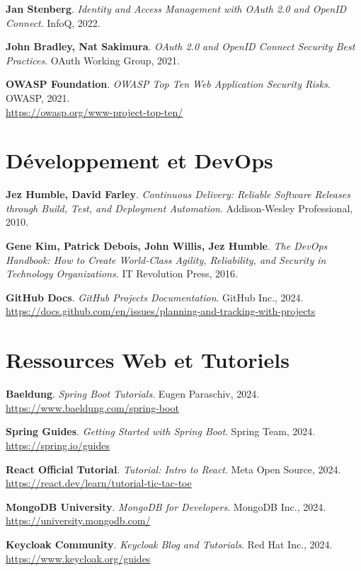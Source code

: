 \noindent [32] \textbf{Jan Stenberg}. \textit{Identity and Access Management with OAuth 2.0 and OpenID Connect}. InfoQ, 2022.

\noindent [33] \textbf{John Bradley, Nat Sakimura}. \textit{OAuth 2.0 and OpenID Connect Security Best Practices}. OAuth Working Group, 2021.

\noindent [34] \textbf{OWASP Foundation}. \textit{OWASP Top Ten Web Application Security Risks}. OWASP, 2021. \\
\url{https://owasp.org/www-project-top-ten/}

\section*{Développement et DevOps}

\noindent [35] \textbf{Jez Humble, David Farley}. \textit{Continuous Delivery: Reliable Software Releases through Build, Test, and Deployment Automation}. Addison-Wesley Professional, 2010.

\noindent [36] \textbf{Gene Kim, Patrick Debois, John Willis, Jez Humble}. \textit{The DevOps Handbook: How to Create World-Class Agility, Reliability, and Security in Technology Organizations}. IT Revolution Press, 2016.

\noindent [37] \textbf{GitHub Docs}. \textit{GitHub Projects Documentation}. GitHub Inc., 2024. \\
\url{https://docs.github.com/en/issues/planning-and-tracking-with-projects}

\section*{Ressources Web et Tutoriels}

\noindent [41] \textbf{Baeldung}. \textit{Spring Boot Tutorials}. Eugen Paraschiv, 2024. \\
\url{https://www.baeldung.com/spring-boot}

\noindent [42] \textbf{Spring Guides}. \textit{Getting Started with Spring Boot}. Spring Team, 2024. \\
\url{https://spring.io/guides}

\noindent [43] \textbf{React Official Tutorial}. \textit{Tutorial: Intro to React}. Meta Open Source, 2024. \\
\url{https://react.dev/learn/tutorial-tic-tac-toe}

\noindent [44] \textbf{MongoDB University}. \textit{MongoDB for Developers}. MongoDB Inc., 2024. \\
\url{https://university.mongodb.com/}

\noindent [45] \textbf{Keycloak Community}. \textit{Keycloak Blog and Tutorials}. Red Hat Inc., 2024. \\
\url{https://www.keycloak.org/guides}

